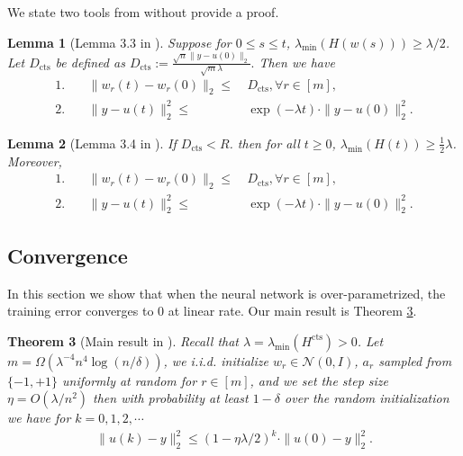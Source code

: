 \documentclass[11pt]{article}
\newcommand{\N}{\mathcal{N}}
\DeclareMathOperator{\cts}{cts}
\newtheorem{theorem}{Theorem}
\newtheorem{lemma}[theorem]{Lemma}
\begin{document}
We state two tools from \cite{dzps19} without provide a proof. %

\begin{lemma}[Lemma 3.3 in \cite{dzps19}]\label{lem:3.3}
Suppose for $0 \leq s \leq t$, $\lambda_{\min} ( H( w(s) ) ) \geq \lambda / 2$. Let $D_{\cts}$ be defined as
$
D_{\cts} := \frac{ \sqrt{n} \| y - u(0) \|_2 }{ \sqrt{m} \lambda }.
$
Then we have 
\begin{align*}
1. & ~ & \| w_r(t) - w_r(0) \|_2 \leq & ~ D_{\cts} , \forall r \in [m], \\
2. & ~ & \| y - u(t) \|_2^2 \leq  &~ \exp( - \lambda t ) \cdot \| y - u(0) \|_2^2.
\end{align*}
\end{lemma}


\begin{lemma}[Lemma 3.4 in \cite{dzps19}]\label{lem:3.4}
If $D_{\cts}<R$.
then for all $t\geq 0$,
$\lambda_{\min}(H(t))\geq \frac{1}{2}\lambda$.
Moreover,
\begin{align*}
1. & ~ & \|w_r(t)-w_r(0)\|_2 \leq & ~ D_{\cts}, \forall r \in [m], \\
2. & ~ & \|y-u(t)\|_2^2 \leq & ~ \exp(-\lambda t) \cdot \|y-u(0)\|_2^2.
\end{align*}
\end{lemma}




\subsection{Convergence}
In this section we show that when the neural network is over-parametrized,
the training error converges to 0 at linear rate.
Our main result is Theorem \ref{thm:quartic}.

\begin{theorem}[Main result in \cite{sy19}]\label{thm:quartic}
Recall that $\lambda=\lambda_{\min}(H^{\cts})>0$.
Let $m = \Omega( \lambda^{-4} n^4 \log (n/\delta) )$, we i.i.d. initialize $w_r \in {\N}(0,I)$, $a_r$ sampled from $\{-1,+1\}$ uniformly at random for $r\in [m]$, and we set the step size $\eta = O( \lambda / n^2 )$ then with probability at least $1-\delta$ over the random initialization we have for $k = 0,1,2,\cdots$
\begin{align}\label{eq:quartic_condition}
\| u (k) - y \|_2^2 \leq ( 1 - \eta \lambda / 2 )^k \cdot \| u (0) - y \|_2^2.
\end{align}
\end{theorem}
\end{document}
